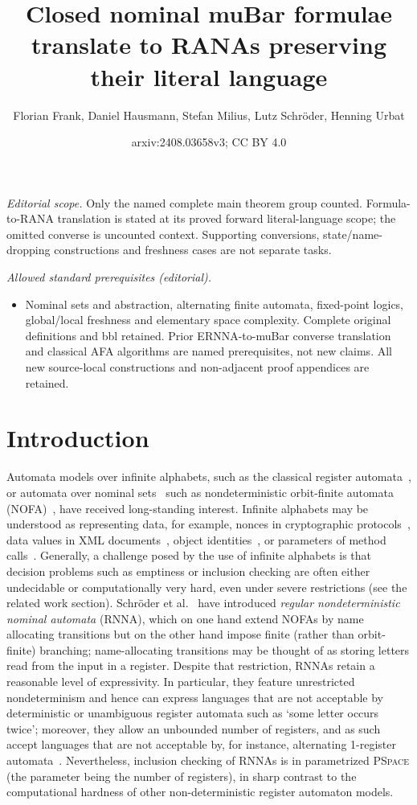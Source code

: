 \documentclass[10pt,a4paper]{amsart}
\title{Closed nominal muBar formulae translate to RANAs preserving their literal language}
\author{Florian Frank, Daniel Hausmann, Stefan Milius, Lutz Schröder, Henning Urbat}
\date{arxiv:2408.03658v3; CC BY 4.0}
\theoremstyle{definition}
\newcommand{\PSPACE}{\textsc{PSpace}\xspace}
\begin{document}
\maketitle
\noindent\textit{Editorial scope.} Only the named complete main theorem group counted. Formula-to-RANA translation is stated at its proved forward literal-language scope; the omitted converse is uncounted context. Supporting conversions, state/name-dropping constructions and freshness cases are not separate tasks.\par\medskip
\noindent\textit{Allowed standard prerequisites (editorial).}\begin{itemize}
\item Nominal sets and abstraction, alternating finite automata, fixed-point logics, global/local freshness and elementary space complexity. Complete original definitions and bbl retained. Prior ERNNA-to-muBar converse translation and classical AFA algorithms are named prerequisites, not new claims. All new source-local constructions and non-adjacent proof appendices are retained.
\end{itemize}\medskip
\section{Introduction}\label{sec:intro}

Automata models over infinite alphabets, such as the classical register
automata~\cite{KaminskiFrancez94}, or automata over nominal sets~\cite{Pitts2013} such as
nondeterministic orbit-finite automata (NOFA)~\cite{BojanczykEA14}, have received long-standing
interest.  Infinite alphabets may be understood as representing data, for example, nonces in
cryptographic protocols~\cite{KurtzEA07}, data values in XML documents~\cite{NevenEA04}, object
identities~\cite{GrigoreEA13}, or parameters of method calls~\cite{HowarEA19}.  Generally, a
challenge posed by the use of infinite alphabets is that decision problems such as emptiness or
inclusion checking are often either undecidable or computationally very hard, even under severe
restrictions (see the related work section).  Schröder et al.~\cite{skmw17} have introduced
\emph{regular nondeterministic nominal automata} (RNNA), which on one hand extend NOFAs by name
allocating transitions but on the other hand impose finite (rather than orbit-finite)
branching; name-allocating transitions may be thought of as storing letters read from the input
in a register. Despite that restriction, RNNAs retain a reasonable level of expressivity. In
particular, they feature unrestricted nondeterminism and hence can express languages that are
not acceptable by deterministic or unambiguous register automata such as `some letter occurs
twice'; moreover, they allow an unbounded number of registers, and as such accept languages
that are not acceptable by, for instance, alternating 1-register
automata~\cite{skmw17}. Nevertheless, inclusion checking of RNNAs is in parametrized \PSPACE
(the parameter being the number of registers), in sharp contrast to the computational hardness
of other non-deterministic register automaton models.
\end{document}
